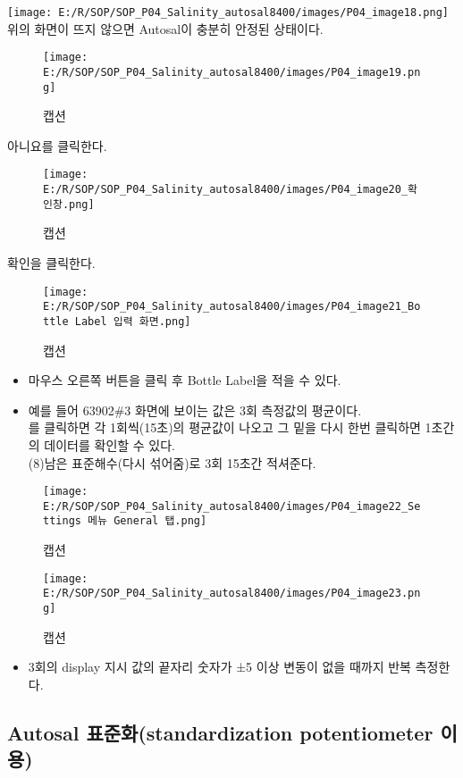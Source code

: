 \documentclass[
]{book}
\providecommand{\tightlist}{%
  \setlength{\itemsep}{0pt}\setlength{\parskip}{0pt}}
\begin{document}
\texttt{[image: E:/R/SOP/SOP\_P04\_Salinity\_autosal8400/images/P04\_image18.png]}
위의 화면이 뜨지 않으면 Autosal이 충분히 안정된 상태이다.

\begin{figure}
\centering
\texttt{[image: E:/R/SOP/SOP\_P04\_Salinity\_autosal8400/images/P04\_image19.png]}
\caption{캡션}
\end{figure}

아니요를 클릭한다.

\begin{figure}
\centering
\texttt{[image: E:/R/SOP/SOP\_P04\_Salinity\_autosal8400/images/P04\_image20\_확인창.png]}
\caption{캡션}
\end{figure}

확인을 클릭한다.

\begin{figure}
\centering
\texttt{[image: E:/R/SOP/SOP\_P04\_Salinity\_autosal8400/images/P04\_image21\_Bottle Label 입력 화면.png]}
\caption{캡션}
\end{figure}

\begin{itemize}
\tightlist
\item
  마우스 오른쪽 버튼을 클릭 후 Bottle Label을 적을 수 있다.\\
\item
  예를 들어 63902\#3 화면에 보이는 값은 3회 측정값의 평균이다.\\
  를 클릭하면 각 1회씩(15초)의 평균값이 나오고 그 밑을 다시 한번 클릭하면 1초간의 데이터를 확인할 수 있다.\\
  (8)남은 표준해수(다시 섞어줌)로 3회 15초간 적셔준다.
\end{itemize}

\begin{figure}
\centering
\texttt{[image: E:/R/SOP/SOP\_P04\_Salinity\_autosal8400/images/P04\_image22\_Settings 메뉴 General 탭.png]}
\caption{캡션}
\end{figure}

\begin{figure}
\centering
\texttt{[image: E:/R/SOP/SOP\_P04\_Salinity\_autosal8400/images/P04\_image23.png]}
\caption{캡션}
\end{figure}

\begin{itemize}
\tightlist
\item
  3회의 display 지시 값의 끝자리 숫자가 ±5 이상 변동이 없을 때까지 반복 측정한다.
\end{itemize}

\hypertarget{autosal-uxd45cuxc900uxd654standardization-potentiometer-uxc774uxc6a9}{%
\subsection{Autosal 표준화(standardization potentiometer 이용)}\label{autosal-uxd45cuxc900uxd654standardization-potentiometer-uxc774uxc6a9}}
\end{document}
